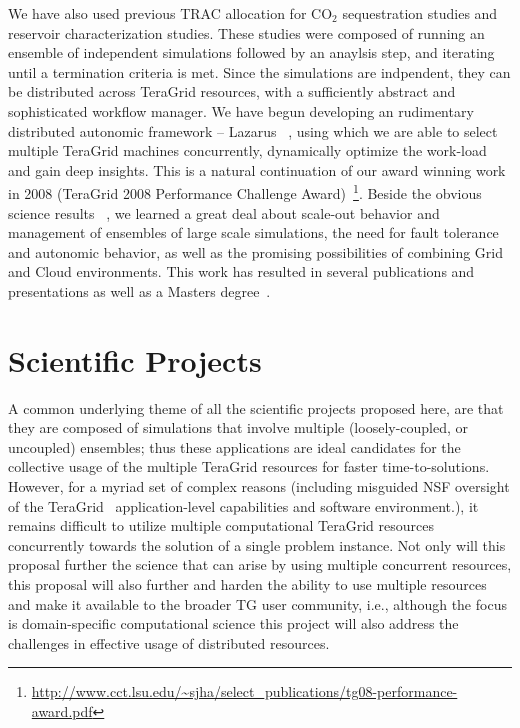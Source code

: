 \documentclass[a4paper,10pt]{article}
\newcommand{\up}{\vspace*{-1em}}
\begin{document}
We have also used previous TRAC allocation for CO$_2$ sequestration studies and reservoir characterization studies. These studies were composed of running an ensemble of independent simulations followed by an anaylsis step, and iterating until a termination criteria is met.  Since the simulations are indpendent, they can be distributed across TeraGrid resources, with a sufficiently abstract and sophisticated workflow manager.  We have begun developing an rudimentary distributed autonomic framework -- Lazarus ~\cite{gmac}, using which we are able to select multiple TeraGrid machines concurrently, dynamically optimize the work-load and gain deep insights. This is a natural continuation of our award winning work in 2008 (TeraGrid 2008 Performance Challenge Award)~\footnote{\url{http://www.cct.lsu.edu/~sjha/select_publications/tg08-performance-award.pdf}}. Beside the obvious science results ~\cite{TG10yye00}, we learned a great deal about scale-out behavior and management of ensembles of large scale simulations, the need for fault tolerance and autonomic behavior, as well as the promising possibilities of combining Grid and Cloud environments. This work has resulted in several publications \cite{Cloud1,Cloud2,MSEScience,TG10yye00} and presentations as well as a Masters degree~\cite{Elkhamra2009}.

\up\up
\section{Scientific Projects}
\up
A common underlying theme of all the scientific projects proposed here, are that they are composed of simulations that involve multiple (loosely-coupled, or uncoupled) ensembles; thus these applications are ideal candidates for the collective usage of the multiple TeraGrid resources for faster time-to-solutions. However, for a myriad set of complex reasons (including misguided NSF oversight of the TeraGrid~\cite{dpa-grid09} application-level capabilities and software environment.), it remains difficult to utilize multiple computational TeraGrid resources concurrently towards the solution of a single problem instance.  Not only will this proposal further the science that can arise by using multiple concurrent resources, this proposal will also further and harden the ability to use multiple resources and make it available to the broader TG user community, i.e., although the focus is domain-specific computational science this project will also address the challenges in effective usage of distributed resources.
\end{document}
